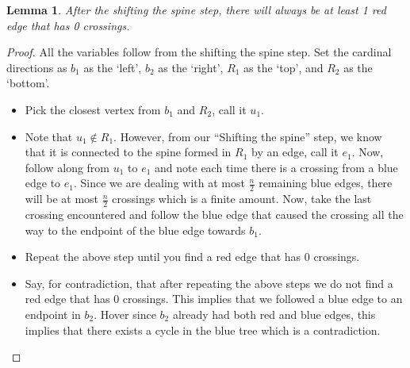 \documentclass{article}
\newtheorem{lemma}[theorem]{Lemma}
\begin{document}
\begin{lemma}
	After the shifting the spine step, there will always be at least 1 red edge that has 0 crossings.
\end{lemma}
\begin{proof}
	\label{lem:zero-red-crossing-edge}
	All the variables follow from the shifting the spine step.
	Set the cardinal directions as $b_1$ as the `left', $b_2$ as the `right', $R_1$ as the `top', and $R_2$ as the `bottom'.

	\begin{itemize}
		\item Pick the closest vertex from $b_1$ and $R_2$, call it $u_1$.
		\item Note that $u_1 \not\in R_1$. However, from our ``Shifting the spine'' step, we know that it is connected to the spine formed in $R_1$ by an edge, call it $e_1$. Now, follow along from $u_1$ to $e_1$ and note each time there is a crossing from a blue edge to $e_1$. Since we are dealing with at most $\frac{n}{2}$ remaining blue edges, there will be at most $\frac{n}{2}$ crossings which is a finite amount. Now, take the last crossing encountered and follow the blue edge that caused the crossing all the way to the endpoint of the blue edge towards $b_1$.
		\item Repeat the above step until you find a red edge that has $0$ crossings.
		\item Say, for contradiction, that after repeating the above steps we do not find a red edge that has $0$ crossings. This implies that we followed a blue edge to an endpoint in $b_2$. Hover since $b_2$ already had both red and blue edges, this implies that there exists a cycle in the blue tree which is a contradiction.
	\end{itemize}
\end{proof}



\end{document}
